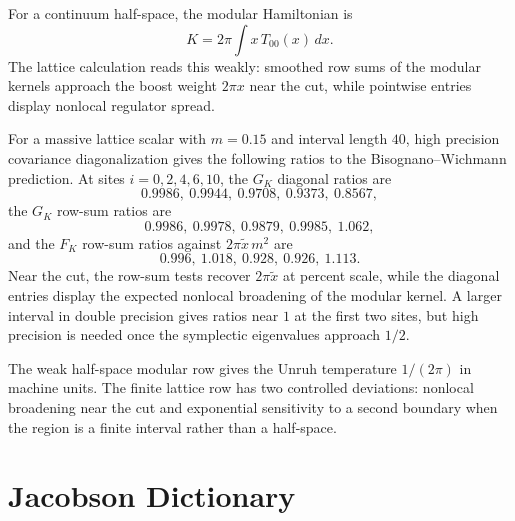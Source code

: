 \begin{principle}
\label{prin:innovation-input-thermo-bw-read}
For a continuum half-space, the modular Hamiltonian is
$$
K=2\pi\int x\,T_{00}(x)\,dx.
$$
The lattice calculation reads this weakly: smoothed row sums of the
modular kernels approach the boost weight $2\pi x$ near the cut, while
pointwise entries display nonlocal regulator spread.
\end{principle}

\begin{principle}
\label{prin:innovation-input-thermo-weak-modular-numerical-witness}
For a massive lattice scalar with $m=0.15$ and interval length $40$, high
precision covariance diagonalization gives the following ratios to the
Bisognano--Wichmann prediction. At sites $i=0,2,4,6,10$, the
$G_K$ diagonal ratios are
$$
0.9986,\ 0.9944,\ 0.9708,\ 0.9373,\ 0.8567,
$$
the $G_K$ row-sum ratios are
$$
0.9986,\ 0.9978,\ 0.9879,\ 0.9985,\ 1.062,
$$
and the $F_K$ row-sum ratios against $2\pi \tilde x\,m^2$ are
$$
0.996,\ 1.018,\ 0.928,\ 0.926,\ 1.113.
$$
Near the cut, the row-sum tests recover $2\pi\tilde x$ at percent scale,
while the diagonal entries display the expected nonlocal broadening of the
modular kernel. A larger interval in double precision gives ratios near
$1$ at the first two sites, but high precision is needed once the
symplectic eigenvalues approach $1/2$.
\end{principle}

\begin{principle}
\label{prin:innovation-input-thermo-unruh-temperature-boundary}
The weak half-space modular row gives the Unruh temperature
$1/(2\pi)$ in machine units. The finite lattice row has two controlled
deviations: nonlocal broadening near the cut and exponential sensitivity
to a second boundary when the region is a finite interval rather than a
half-space.
\end{principle}

\section{Jacobson Dictionary}
\label{sec:innovation-input-thermo-jacobson-dictionary}

